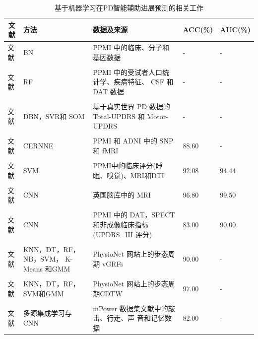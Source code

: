 \begin{table}[htbp]
\centering
\caption{基于机器学习在PD智能辅助进展预测的相关工作}
\label{paper4MLpredictDt}
\small
\begin{tabular}{p{1.8cm}<{\centering}p{3.2cm}<{\centering}p{3.4cm}<{\centering}p{1.35cm}<{\centering}p{1.35cm}<{\centering}}
\hline
\multicolumn{1}{c}{文献} &方法    &数据及来源 &ACC(\%) &AUC(\%)  \\ \hline
文献\cite{latourelle2017large}    &BN  &PPMI 中的临床、分子和基因数据  & -  & -   \\ \\
文献\cite{simuni2016predictors}    &RF  &PPMI 中的受试者人口统计学、疾病特征、
CSF 和DAT 数据  & -  & -   \\ \\
文献\cite{nilashi2020remote}   &DBN，SVR和 SOM  &基于真实世界 PD 数据的 Total-UPDRS 和
Motor-UPDRS  & -  & -   \\ \\
文献\cite{bi2021novel}    &CERNNE  &PPMI 和 ADNI 中的 SNP 和 fMRI  &88.60  & -   \\ \\
文献\cite{lei2017joint}    &SVM  &PPMI中的临床评分(睡眠、嗅觉)、MRI和DTI  &92.08  &94.44   \\ \\
文献\cite{kiryu2019deep}    &CNN  &英国脑库中的 MRI  &96.80  &99.50   \\ \\
文献\cite{adams2021improved}    &CNN  &PPMI 中的 DAT，SPECT 和非成像临床指标
(UPDRS\_III 评分)  &83.00  &90.00   \\ \\
文献\cite{khoury2019data}    &KNN，DT，RF，NB，SVM，
K-Means 和GMM  &PhysioNet 网站上的步态周期 vGRFs  &90.00  & -   \\ \\
文献\cite{khoury2018cdtw}    &KNN，DT，RF，SVM和GMM  &PhysioNet 网站上的步态周期CDTW  &97.00  & -   \\ \\
文献\cite{prince2018multi}   &多源集成学习与CNN  &mPower 数据集文献\cite{he2016deep}中的敲击、行走、声
音和记忆数据  &82.00  & -   \\  \hline
\end{tabular}
\end{table}

